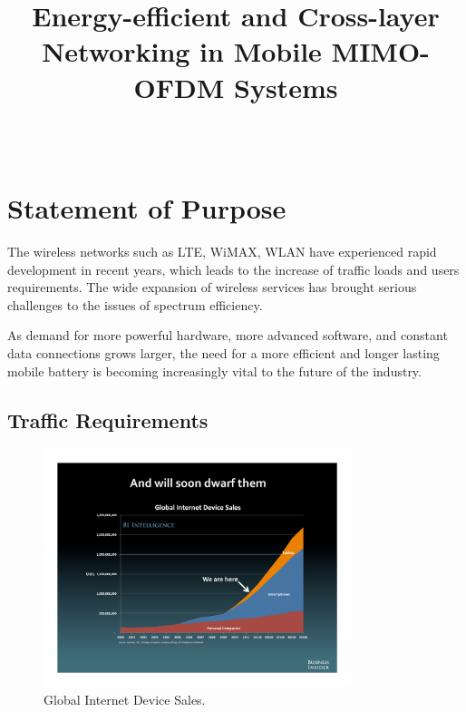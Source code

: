 \documentclass[journal,onecolumn,12pt]{IEEEtran}
\begin{document}
\title{Energy-efficient and Cross-layer Networking in Mobile MIMO-OFDM Systems}

\author{ \\
}

\maketitle
%


\section{Statement of Purpose}
The wireless networks such as LTE, WiMAX, WLAN have experienced rapid development in recent years, which leads to the increase of traffic loads and users requirements. The wide expansion of wireless services has brought serious challenges to the issues of spectrum efficiency.

As demand for more powerful hardware, more advanced software, and constant data connections grows larger, the need for a more efficient and longer lasting mobile battery is becoming increasingly vital to the future of the industry.

\subsection{Traffic Requirements}
\begin{figure}
\centering
\includegraphics[width=0.8\textwidth]{device_trend.pdf}
\caption{Global Internet Device Sales.}
\label{fig:device_trend}
\end{figure}
\end{document}
